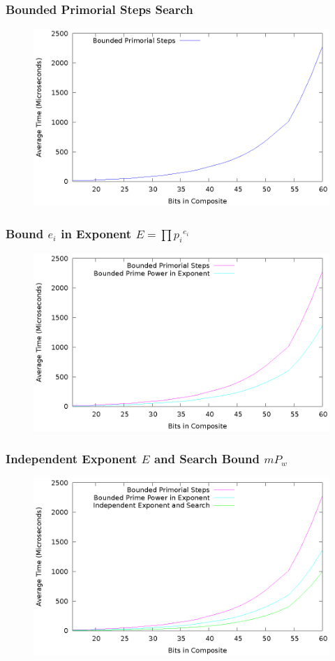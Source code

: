 \documentclass{beamer}
\begin{document}
\begin{frame}
\frametitle{Bounded Primorial Steps Search}
\begin{figure}
\includegraphics[scale=0.86]{sspar-theoretical}
\end{figure}
\end{frame}
\begin{frame}
\frametitle{Bound $e_i$ in Exponent $E = \prod {p_i}^{e_i}$}
\begin{figure}
\includegraphics[scale=0.86]{sspar-power-bound}
\end{figure}
\end{frame}
\begin{frame}
\frametitle{Independent Exponent $E$ and Search Bound $mP_w$}
\begin{figure}
\includegraphics[scale=0.86]{sspar-noreuse}
\end{figure}
\end{frame}
\end{document}
